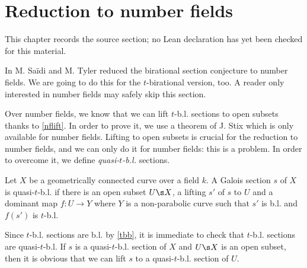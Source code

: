 \chapter{Reduction to number fields}
\label{birational-section-conjecture-strong-birationality-chapter-06}

\begin{remark}
\label{birational-section-conjecture-strong-birationality-chapter-06-source}
This chapter records the source section; no Lean declaration has yet been checked for this material.
\notready
\end{remark}

In \cite{saty21} M. Sa\"idi and M. Tyler reduced the birational section conjecture to number fields. We are going to do this for the $t$-birational version, too. A reader only interested in number fields may safely skip this section.

Over number fields, we know that we can lift $t$-b.l. sections to open subsets thanks to \autoref{nflift}. In order to prove it, we use a theorem of J. Stix \cite[Theorem B]{sti13} which is only available for number fields. Lifting to open subsets is crucial for the reduction to number fields, and we can only do it for number fields: this is a problem. In order to overcome it, we define \emph{quasi-$t$-b.l.} sections.

\begin{definition}
\notready
	Let $X$ be a geometrically connected curve over a field $k$. A Galois section $s$ of $X$ is quasi-$t$-b.l. if there is an open subset $U\s X$, a lifting $s'$ of $s$ to $U$ and a dominant map $f:U\to Y$ where $Y$ is a non-parabolic curve such that $s'$ is b.l. and $f(s')$ is $t$-b.l.
\end{definition}

Since $t$-b.l. sections are b.l. by \autoref{tbb}, it is immediate to check that $t$-b.l. sections are quasi-$t$-b.l. If $s$ is a quasi-$t$-b.l. section of $X$ and $U\s X$ is an open subset, then it is obvious that we can lift $s$ to a quasi-$t$-b.l. section of $U$.

